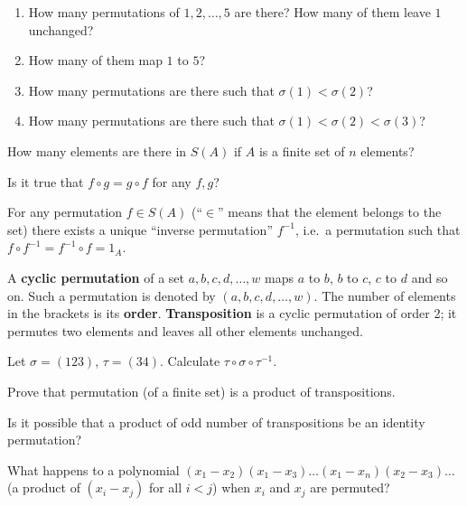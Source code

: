 \documentclass[12pt]{article}
\begin{document}
\begin{zadacha}
\begin{enumerate}
\item How many permutations of $1,2,\dots,5$ are there? How many of
  them leave $1$ unchanged?
\item How many of them map $1$ to $5$?
\item How many permutations are there such that $\sigma(1) <
  \sigma(2)$? 
\item How many permutations are there such that $\sigma(1) < \sigma(2)
  < \sigma(3)$?
\end{enumerate}
\end{zadacha}

\begin{zadacha} 
How many elements are there in $S(A)$  if $A$ is a finite set of $n$
elements?
\end{zadacha}

\begin{zadacha}  
Is it true that $f\circ g = g\circ f$ for any $f, g$?
\end{zadacha}

For any permutation $f\in S(A)$ (``$\in$'' means that the element
belongs to the set) there exists a unique ``inverse permutation''
$f^{-1}$, i.e.\ a permutation such that $f\circ f^{-1} = f^{-1}\circ f
= 1_A$.

A {\bf cyclic permutation} of a set $a,b,c,d, \dots, w$ maps $a$ to
$b$, $b$ to $c$, $c$ to $d$ and so on.  Such a permutation is denoted
by $(a,b,c,d,\dots,w)$.  The number of elements in the brackets is its
{ \bf order}. {\bf Transposition} is a cyclic permutation of order 2;
it permutes two elements and leaves all other elements unchanged.

\begin{zadacha}
Let $\sigma = (123)$, $\tau=(34)$. Calculate $\tau \circ \sigma \circ
\tau^{-1}$.
\end{zadacha}

\begin{zadacha}
Prove that permutation (of a finite set) is a product of transpositions.
\end{zadacha}

\begin{zadacha}[*] Is it possible that a product of odd number of
  transpositions be an identity permutation?
\end{zadacha}

\begin{ukazanie} What happens to a polynomial 
$(x_1-x_2)(x_1-x_3)\dots(x_1-x_n)(x_2-x_3)\dots$ (a product of $(x_i -
x_j)$ for all $i < j$) when  $x_i$ and $x_j$ are permuted?
\end{ukazanie}
\end{document}
